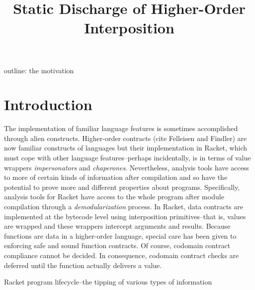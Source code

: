 \documentclass{sigplanconf}
\title{Static Discharge of Higher-Order Interposition}
\begin{document}
\maketitle





outline:
the motivation

\section{Introduction}

The implementation of familiar language features is sometimes accomplished through alien constructs.
Higher-order contracts (cite Felleisen and Findler) are now familiar constructs of languages but their implementation in Racket, which must cope with other language features--perhaps incidentally, is in terms of value wrappers \emph{impersonators} and \emph{chaperones}.
Nevertheless, analysis tools have access to more of certain kinds of information after compilation and so have the potential to prove more and different properties about programs.
Specifically, analysis tools for Racket have access to the whole program after module compilation through a \emph{demodularization} process.
In Racket, data contracts are implemented at the bytecode level using interposition primitives--that is, values are wrapped and these wrappers intercept arguments and results.
Because functions are data in a higher-order language, special care has been given to enforcing safe and sound function contracts.
Of course, codomain contract compliance cannot be decided.
In consequence, codomain contract checks are deferred until the function actually delivers a value.

Racket program lifecycle--the tipping of various types of information
\end{document}
